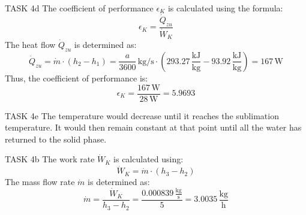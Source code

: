 TASK 4d  
The coefficient of performance \( \epsilon_K \) is calculated using the formula:  
\[
\epsilon_K = \frac{\dot{Q}_{zu}}{\dot{W}_K}
\]  
The heat flow \( \dot{Q}_{zu} \) is determined as:  
\[
\dot{Q}_{zu} = \dot{m} \cdot (h_2 - h_1) = \frac{a}{3600} \, \text{kg/s} \cdot \left( 293.27 \, \frac{\text{kJ}}{\text{kg}} - 93.92 \, \frac{\text{kJ}}{\text{kg}} \right) = 167 \, \text{W}
\]  
Thus, the coefficient of performance is:  
\[
\epsilon_K = \frac{167 \, \text{W}}{28 \, \text{W}} = 5.9693
\]  

TASK 4e  
The temperature would decrease until it reaches the sublimation temperature. It would then remain constant at that point until all the water has returned to the solid phase.  

TASK 4b  
The work rate \( \dot{W}_K \) is calculated using:  
\[
\dot{W}_K = \dot{m} \cdot (h_3 - h_2)
\]  
The mass flow rate \( \dot{m} \) is determined as:  
\[
\dot{m} = \frac{\dot{W}_K}{h_3 - h_2} = \frac{0.000839 \, \frac{\text{kg}}{\text{s}}}{5} = 3.0035 \, \frac{\text{kg}}{\text{h}}
\]  